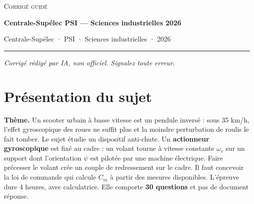 \documentclass[11pt,a4paper]{article}
\begin{document}
\thispagestyle{plain}
\begin{center}
  {\small\scshape Corrigé guidé}\par\smallskip
  {\LARGE\bfseries Centrale-Supélec PSI — Sciences industrielles 2026\par}\medskip
  {\large Centrale-Supélec · PSI · Sciences industrielles · 2026\par}
\end{center}
\vspace{2pt}\hrule\vspace{8pt}

\emph{Corrigé rédigé par IA, non officiel. Signalez toute erreur.}

\hypertarget{pruxe9sentation-du-sujet}{%
\section{Présentation du sujet}\label{pruxe9sentation-du-sujet}}

\textbf{Thème.} Un scooter urbain à basse vitesse est un pendule inversé : sous 35 km/h, l'effet gyroscopique des roues ne suffit plus et la moindre perturbation de roulis le fait tomber. Le sujet étudie un dispositif anti-chute. Un \textbf{actionneur gyroscopique} est fixé au cadre : un volant tourne à vitesse constante \(\omega_v\) sur un support dont l'orientation \(\psi\) est pilotée par une machine électrique. Faire précesser le volant crée un couple de redressement sur le cadre. Il faut concevoir la loi de commande qui calcule \(C_m\) à partir des mesures disponibles. L'épreuve dure 4 heures, avec calculatrice. Elle comporte \textbf{30 questions} et pas de document réponse.
\end{document}
